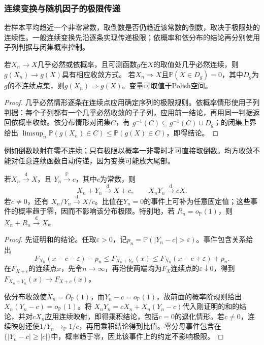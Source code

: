 \subsubsection{连续变换与随机因子的极限传递}
若样本平均趋近一个非零常数，取倒数是否仍趋近该常数的倒数，取决于极限处的连续性。一般连续变换先沿逐条实现传递极限；依概率和依分布的结论再分别使用子列判据与闭集概率控制。
\begin{theorem}[连续映射]
\label{thm:rv-continuous-mapping}
若\(X_n\to X\)几乎必然或依概率，且可测函数\(g\)在\(X\)的取值处几乎必然连续，则\(g(X_n)\to g(X)\)具有相应收敛方式。
若\(X_n\Rightarrow X\)且\(\mathbb P(X\in D_g)=0\)，其中\(D_g\)为\(g\)的不连续点集，则\(g(X_n)\Rightarrow g(X)\)。变量可取值于Polish空间。
\end{theorem}
\begin{proof}
几乎必然情形逐条在连续点应用确定序列的极限规则。依概率情形使用子列判据：每个子列都有一个几乎必然收敛的子子列，应用前一结论，再用同一判据返回依概率收敛。依分布情形对闭集\(C\)，有
\(\overline{g^{-1}(C)}\subseteq g^{-1}(C)\cup D_g\)；的闭集上界给出
\(\limsup_n\mathbb P(g(X_n)\in C)\leq\mathbb P(g(X)\in C)\)，即得结论。
\end{proof}
例如倒数映射在零不连续；只有极限以概率一非零时才可直接取倒数。均方收敛不能对任意连续函数自动传递，因为变换可能放大尾部。
\begin{theorem}[Slutsky定理]
  \label{thm:statistics-slutsky}
  若\(X_n\xrightarrow{\mathrm d}X\)，且
  \(Y_n\xrightarrow{\mathbb{P}}c\)，其中\(c\)为常数，则
  \[
    X_n+Y_n\xrightarrow{\mathrm d}X+c,\qquad
    X_nY_n\xrightarrow{\mathrm d}cX.
  \]
  若\(c\neq0\)，还有
  \(X_n/Y_n\xrightarrow{\mathrm d}X/c\)。比值在\(Y_n=0\)的事件上可补为任意固定值；这些事件的概率趋于零，因而不影响该分布极限。特别地，若
  \(R_n=o_{\mathbb{P}}(1)\)，则
  \(X_n+R_n\xrightarrow{\mathrm d}X\)。
\end{theorem}

\begin{proof}
先证明和的结论。任取\(\varepsilon>0\)，记\(p_n=\mathbb P(|Y_n-c|>\varepsilon)\)。事件包含关系给出
\[
 F_{X_n}(x-c-\varepsilon)-p_n
 \leq F_{X_n+Y_n}(x)
 \leq F_{X_n}(x-c+\varepsilon)+p_n.
\]
在\(F_{X+c}\)的连续点\(x\)，先令\(n\to\infty\)，再沿使两端均为\(F_X\)连续点的\(\varepsilon\downarrow0\)，得到\(F_{X_n+Y_n}(x)\to F_{X+c}(x)\)。

依分布收敛使\(X_n=O_{\mathbb P}(1)\)，而\(Y_n-c=o_{\mathbb P}(1)\)，故前面的概率阶规则给出\(X_n(Y_n-c)=o_{\mathbb P}(1)\)。将
\(X_nY_n=cX_n+X_n(Y_n-c)\)代入刚证明的和的结论，并对\(cX_n\)应用连续映射，即得乘积结论，包括\(c=0\)的退化情形。若\(c\neq0\)，连续映射还使\(1/Y_n\to_{\mathbb P}1/c\)，再用乘积结论得到比值。零分母事件包含在\(\{|Y_n-c|\geq|c|\}\)中，概率趋于零，因此该事件上的约定不影响极限。
\end{proof}

